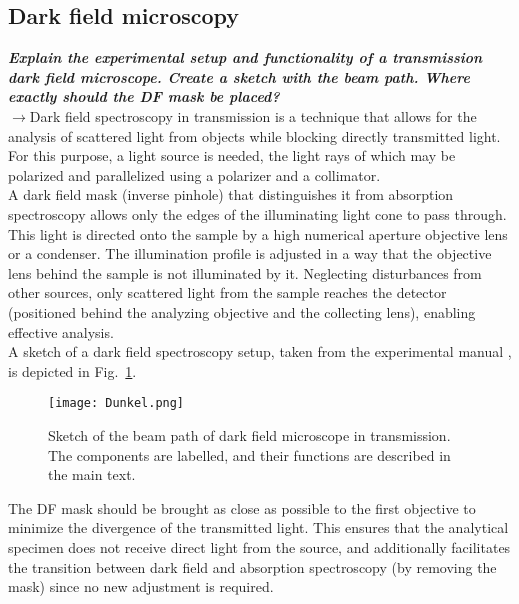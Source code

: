 \subsection{\label{subsec:FZV3}Dark field microscopy}
\textbf{\textit{Explain the experimental setup and functionality of a transmission dark field microscope. 
Create a sketch with the beam path. Where exactly should the DF mask be placed?}} \\
$\rightarrow$Dark field spectroscopy in transmission is a technique that allows for the analysis of scattered light 
from objects while blocking directly transmitted light. For this purpose, a light source is needed, the light rays 
of which may be polarized and parallelized using a polarizer and a collimator. \\
A dark field mask (inverse pinhole) that distinguishes it from absorption spectroscopy allows only the edges of the 
illuminating light cone to pass through. This light is directed onto the sample by a high numerical aperture objective 
lens or a condenser. The illumination profile is adjusted in a way that the objective lens behind the sample is not 
illuminated by it. Neglecting disturbances from other sources, only scattered light from the sample reaches the detector 
(positioned behind the analyzing objective and the collecting lens), enabling effective analysis. \\
A sketch of a dark field spectroscopy setup, taken from the experimental manual \cite{Anleitung}, 
is depicted in Fig.~\ref{fig:aufbau}.
\begin{figure}[h!]
    \centering
    \texttt{[image: Dunkel.png]}
    \caption{\label{fig:aufbau}Sketch of the beam path of dark field microscope in transmission. 
    The components are labelled, and their functions are described in the main text.}
\end{figure}\FloatBarrier
The DF mask should be brought as close as possible to the first objective to minimize the divergence 
of the transmitted light. This ensures that the analytical specimen does not receive direct light 
from the source, and additionally facilitates the transition between dark field and 
absorption spectroscopy (by removing the mask) since no new adjustment is required. \\

